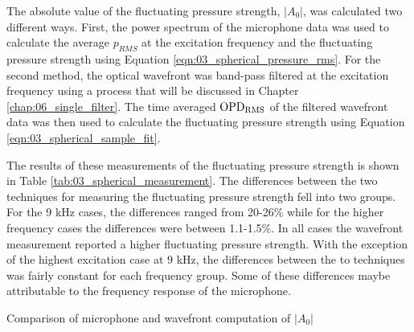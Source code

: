 The absolute value of the fluctuating pressure strength, $|A_0|$, was calculated two different ways.
First, the power spectrum of the microphone data was used to calculate the average $p_{RMS}$ at the excitation frequency and the fluctuating pressure strength using Equation \ref{eqn:03_spherical_pressure_rms}.
For the second method, the optical wavefront was band-pass filtered at the excitation frequency using a process that will be discussed in Chapter \ref{chap:06_single_filter}.
The time averaged $\operatorname{OPD_{RMS}}$ of the filtered wavefront data was then used to calculate the fluctuating pressure strength using Equation \ref{eqn:03_spherical_sample_fit}.

The results of these measurements of the fluctuating pressure strength is shown in Table \ref{tab:03_spherical_measurement}.
The differences between the two techniques for measuring the fluctuating pressure strength fell into two groups.
For the 9 kHz cases, the differences ranged from 20-26\% while for the higher frequency cases the differences were between 1.1-1.5\%.
In all cases the wavefront measurement reported a higher fluctuating pressure strength.
With the exception of the highest excitation case at 9 kHz, the differences between the to techniques was fairly constant for each frequency group.
Some of these differences maybe attributable to the frequency response of the microphone.
\begin{table}
  \centering
  \caption{Comparison of microphone and wavefront computation of $|A_0|$}
  
  \label{tab:03_spherical_measurement}
\end{table}

